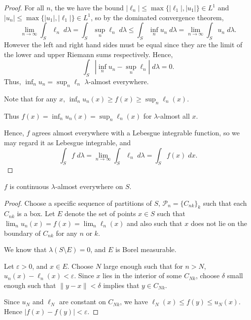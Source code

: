 \documentclass{unswmaths}
\begin{document}
\begin{proof}
    For all $n$, the we have the bound $|\ell_n| \leq \max\{|\ell_1|,|u_1|\} \in L^1$
    and $|u_n| \leq \max\{|u_1|,|\ell_1|\} \in L^1$,    
    so by the dominated
    convergence theorem,
    \begin{equation*}
        \lim_{n\rightarrow\infty} \int_S \ell_n\;d\lambda = \int_S \sup_{n} \ell_n\;d\lambda \leq \int_S \inf_{n} u_n\;d\lambda = \lim_{n\rightarrow\infty}\int_Su_n\;d\lambda.
    \end{equation*}
    However the left and right hand sides must be equal since they are the limit of the lower and upper Riemann sums respectively. Hence,
    \begin{equation*}
        \int_S |\inf_n u_n-\sup_n \ell_n|\;d\lambda = 0.
    \end{equation*}
    Thus, $\inf_n u_n = \sup_n \ell_n$ $\lambda$-almost everywhere.
    
    Note that for any $x$, $\inf_n u_n(x) \geq f(x) \geq \sup_n \ell_n(x)$.
    
    Thus $f(x) = \inf_n u_n(x) = \sup_n \ell_n(x)$ for $\lambda$-almost all $x$.
    
    Hence, $f$ agrees almost everywhere with a Lebesgue integrable function, so we may
    regard it as Lebesgue integrable, and
    \begin{equation*}
        \int_S f\;d\lambda = \lim_{n\rightarrow\infty} \int_S \ell_n\;d\lambda = \int_S f(x)\;dx.
    \end{equation*}
    
\end{proof}

\begin{theorem}
    $f$ is continuous $\lambda$-almost everywhere on $S$.
\end{theorem}
\begin{proof}
    Choose a specific sequence of partitions of $S$, $\mathcal{P}_n = \{C_{nk}\}_k$
    such that each $C_{nk}$ is a box. Let $E$ denote the set of points
     $x \in S$ such that $\lim_n u_n(x) = f(x) = \lim_n \ell_n(x)$
     and also such that $x$ does not lie on the boundary of $C_{nk}$ for any $n$ or $k$.
     
     We know that $\lambda(S\setminus E) = 0$, and $E$ is Borel measurable.
     
    Let $\varepsilon > 0$, and $x \in E$. Choose $N$ large enough such that for $n > N$,
    $u_n(x) -\ell_n(x) < \varepsilon$. Since $x$ lies in the interior of some $C_{Nk}$, choose $\delta$
    small enough such that $\|y-x\| < \delta$ implies that $y \in C_{Nk}$.
    
    Since $u_N$ and $\ell_N$ are constant on $C_{Nk}$, we have $\ell_N(x) \leq f(y) \leq u_N(x)$. 
    Hence $|f(x)-f(y)| < \varepsilon$.
\end{proof}
\end{document}
